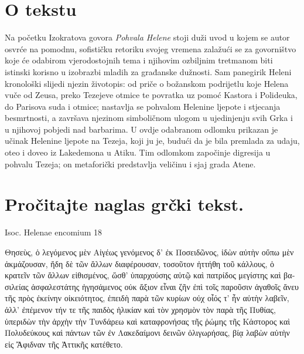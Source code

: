 


\section*{O tekstu}

Na početku Izokratova govora \textit{Pohvala Helene} stoji duži uvod u kojem se autor osvrće na pomodnu, sofističku retoriku svojeg vremena zalažući se za govorništvo koje će odabirom vjerodostojnih tema i njihovim ozbiljnim tretmanom biti istinski korisno u izobrazbi mladih za građanske dužnosti. Sam panegirik Heleni kronološki slijedi njezin životopis: od priče o božanskom podrijetlu koje Helena vuče od Zeusa, preko Tezejeve otmice te povratka uz pomoć Kastora i Polideuka, do Parisova suda i otmice; nastavlja se pohvalom Helenine ljepote i stjecanja besmrtnosti, a završava njezinom simboličnom ulogom u ujedinjenju svih Grka i u njihovoj pobjedi nad barbarima. U ovdje odabranom odlomku prikazan je učinak Helenine ljepote na Tezeja, koji ju je, budući da je bila premlada za udaju, oteo i doveo iz Lakedemona u Atiku. Tim odlomkom započinje digresija u pohvalu Tezeja; on metaforički predstavlja veličinu i sjaj grada Atene.


\section*{Pročitajte naglas grčki tekst.}
Isoc. Helenae encomium 18

\medskip

{\large
\begin{greek}
\noindent Θησεὺς, ὁ λεγόμενος μὲν Αἰγέως γενόμενος δ' ἐκ Ποσειδῶνος, ἰδὼν αὐτὴν οὔπω μὲν ἀκμάζουσαν, ἤδη δὲ τῶν ἄλλων διαφέρουσαν, τοσοῦτον ἡττήθη τοῦ κάλλους, ὁ κρατεῖν τῶν ἄλλων εἰθισμένος, ὥσθ' ὑπαρχούσης αὐτῷ καὶ πατρίδος μεγίστης καὶ βασιλείας ἀσφαλεστάτης ἡγησάμενος οὐκ ἄξιον εἶναι ζῆν ἐπὶ τοῖς παροῦσιν ἀγαθοῖς ἄνευ τῆς πρὸς ἐκείνην οἰκειότητος, ἐπειδὴ παρὰ τῶν κυρίων οὐχ οἷός τ' ἦν αὐτὴν λαβεῖν, ἀλλ' ἐπέμενον τήν τε τῆς παιδὸς ἡλικίαν καὶ τὸν χρησμὸν τὸν παρὰ τῆς Πυθίας, ὑπεριδὼν τὴν ἀρχὴν τὴν Τυνδάρεω καὶ καταφρονήσας τῆς ῥώμης τῆς Κάστορος καὶ Πολυδεύκους καὶ πάντων τῶν ἐν Λακεδαίμονι δεινῶν ὀλιγωρήσας, βίᾳ λαβὼν αὐτὴν εἰς Ἄφιδναν τῆς Ἀττικῆς κατέθετο.

\end{greek}

}

